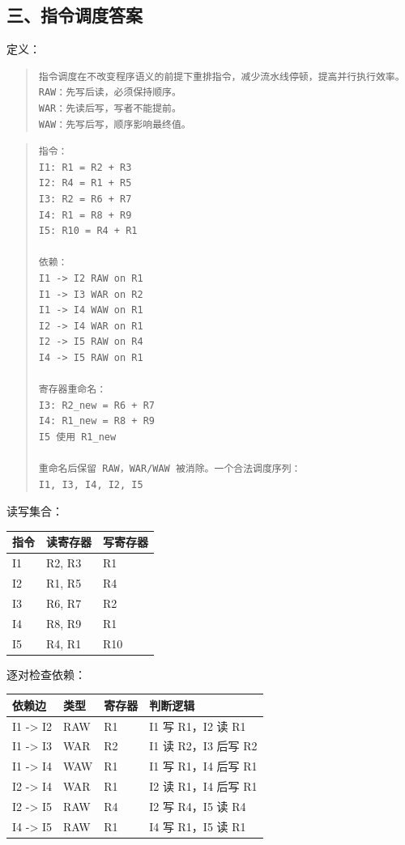 \documentclass[UTF8,zihao=-4]{ctexart}
\begin{document}
\subsection{三、指令调度答案}


定义：


\begin{quote}
\footnotesize
\begin{verbatim}
指令调度在不改变程序语义的前提下重排指令，减少流水线停顿，提高并行执行效率。
RAW：先写后读，必须保持顺序。
WAR：先读后写，写者不能提前。
WAW：先写后写，顺序影响最终值。
\end{verbatim}
\end{quote}


\begin{quote}
\footnotesize
\begin{verbatim}
指令：
I1: R1 = R2 + R3
I2: R4 = R1 + R5
I3: R2 = R6 + R7
I4: R1 = R8 + R9
I5: R10 = R4 + R1

依赖：
I1 -> I2 RAW on R1
I1 -> I3 WAR on R2
I1 -> I4 WAW on R1
I2 -> I4 WAR on R1
I2 -> I5 RAW on R4
I4 -> I5 RAW on R1

寄存器重命名：
I3: R2_new = R6 + R7
I4: R1_new = R8 + R9
I5 使用 R1_new

重命名后保留 RAW，WAR/WAW 被消除。一个合法调度序列：
I1, I3, I4, I2, I5
\end{verbatim}
\end{quote}

读写集合：

\begin{center}
\footnotesize
\begin{tabular}{lll}
\hline
指令 & 读寄存器 & 写寄存器 \\
\hline
I1 & R2, R3 & R1 \\
I2 & R1, R5 & R4 \\
I3 & R6, R7 & R2 \\
I4 & R8, R9 & R1 \\
I5 & R4, R1 & R10 \\
\hline
\end{tabular}
\end{center}

逐对检查依赖：

\begin{center}
\footnotesize
\begin{tabular}{llll}
\hline
依赖边 & 类型 & 寄存器 & 判断逻辑 \\
\hline
I1 -> I2 & RAW & R1 & I1 写 R1，I2 读 R1 \\
I1 -> I3 & WAR & R2 & I1 读 R2，I3 后写 R2 \\
I1 -> I4 & WAW & R1 & I1 写 R1，I4 后写 R1 \\
I2 -> I4 & WAR & R1 & I2 读 R1，I4 后写 R1 \\
I2 -> I5 & RAW & R4 & I2 写 R4，I5 读 R4 \\
I4 -> I5 & RAW & R1 & I4 写 R1，I5 读 R1 \\
\hline
\end{tabular}
\end{center}
\end{document}
